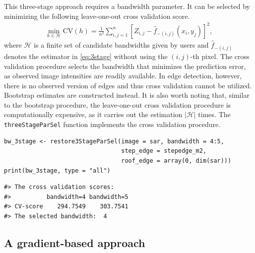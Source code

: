 This three-stage approach requires a bandwidth parameter. It can be selected by minimizing the following leave-one-out cross validation score.
\begin{align}
  \label{eq:loocv}
  \min_{h \in \mathscr{H}} \mathrm{CV}(h) = \frac{1}{n^2} \sum_{i, j = 1}^n \left[ Z_{i, j} - \widehat{f}_{-(i, j)}(x_i, y_j)\right]^2,
\end{align}
where \(\mathscr{H}\) is a finite set of candidate bandwidths given by users and \(\widehat{f}_{-(i, j)}\) denotes the estimator in \eqref{eq:3stage} without using the \((i, j)\)-th pixel. The cross validation procedure selects the bandwidth that minimizes the prediction error, as observed image intensities are readily available. In edge detection, however, there is no observed version of edges and thus cross validation cannot be utilized. Bootstrap estimates are constructed instead. It is also worth noting that, similar to the bootstrap procedure, the leave-one-out cross validation procedure is computationally expensive, as it carries out the estimation \(|\mathscr{H}|\) times. The \texttt{threeStageParSel} function implements the cross validation procedure.

\begin{verbatim}
bw_3stage <- restore3StageParSel(image = sar, bandwidth = 4:5, 
                                 step_edge = stepedge_m2, 
                                 roof_edge = array(0, dim(sar)))
print(bw_3stage, type = "all")
\end{verbatim}

\begin{verbatim}
#> The cross validation scores:
#>          bandwidth=4 bandwidth=5
#> CV-score    294.7549    303.7541
#> The selected bandwidth:  4
\end{verbatim}

\subsection{A gradient-based approach}\label{sec:denoise.grad}

